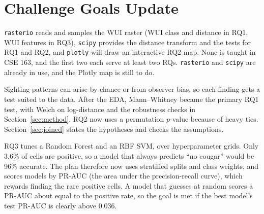\documentclass[11pt, a4paper]{article}
\begin{document}
\section{Challenge Goals Update}
\begin{description}[leftmargin=0pt, itemsep=2pt]
  \item[New Library.] \texttt{rasterio} reads and samples the WUI raster (WUI class and distance in RQ1, WUI features in RQ3), \texttt{scipy} provides the distance transform and the tests for RQ1 and RQ2, and \texttt{plotly} will draw an interactive RQ2 map. None is taught in CSE 163, and the first two each serve at least two RQs. \texttt{rasterio} and \texttt{scipy} are already in use, and the Plotly map is still to do.
  \item[Result Validity.] Sighting patterns can arise by chance or from observer bias, so each finding gets a test suited to the data. After the EDA, Mann--Whitney became the primary RQ1 test, with Welch on log-distance and the robustness checks in Section~\ref{sec:method}. RQ2 now uses a permutation $p$-value because of heavy ties. Section~\ref{sec:joined} states the hypotheses and checks the assumptions.
  \item[Machine Learning.] RQ3 tunes a Random Forest and an RBF SVM, over hyperparameter grids. Only 3.6\% of cells are positive, so a model that always predicts ``no cougar'' would be 96\% accurate. The plan therefore now uses stratified splits and class weights, and scores models by PR-AUC (the area under the precision-recall curve), which rewards finding the rare positive cells. A model that guesses at random scores a PR-AUC about equal to the positive rate, so the goal is met if the best model's test PR-AUC is clearly above 0.036.
\end{description}
\end{document}
